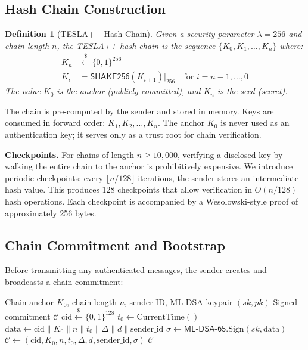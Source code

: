 \documentclass[conference,10pt]{IEEEtran}
\newtheorem{definition}[theorem]{Definition}
\newcommand{\SHAKE}{\textsf{SHAKE256}}
\newcommand{\MLDSA}{\textsf{ML-DSA-65}}
\begin{document}
\subsection{Hash Chain Construction}

\begin{definition}[TESLA++ Hash Chain]
Given a security parameter $\lambda = 256$ and chain length $n$, the TESLA++ hash chain is the sequence $\{K_0, K_1, \ldots, K_n\}$ where:
\begin{align}
  K_n &\xleftarrow{\$} \{0,1\}^{256} \label{eq:seed}\\
  K_i &= \SHAKE{}(K_{i+1})\big|_{256} \quad \text{for } i = n{-}1, \ldots, 0 \label{eq:chain}
\end{align}
The value $K_0$ is the \emph{anchor} (publicly committed), and $K_n$ is the \emph{seed} (secret).
\end{definition}

The chain is pre-computed by the sender and stored in memory. Keys are consumed in forward order: $K_1, K_2, \ldots, K_n$. The anchor $K_0$ is never used as an authentication key; it serves only as a trust root for chain verification.

\textbf{Checkpoints.} For chains of length $n \geq 10{,}000$, verifying a disclosed key by walking the entire chain to the anchor is prohibitively expensive. We introduce periodic checkpoints: every $\lfloor n/128 \rfloor$ iterations, the sender stores an intermediate hash value. This produces 128 checkpoints that allow verification in $O(n/128)$ hash operations. Each checkpoint is accompanied by a Wesolowski-style proof of approximately 256 bytes.

\subsection{Chain Commitment and Bootstrap}

Before transmitting any authenticated messages, the sender creates and broadcasts a chain commitment:

\begin{algorithm}[t]
\caption{TESLA++ Chain Commitment}
\label{alg:commitment}
\begin{algorithmic}[1]
\REQUIRE Chain anchor $K_0$, chain length $n$, sender ID, ML-DSA keypair $(sk, pk)$
\ENSURE Signed commitment $\mathcal{C}$
\STATE $\text{cid} \xleftarrow{\$} \{0,1\}^{128}$ 
\STATE $t_0 \gets \text{CurrentTime}()$
\STATE $\text{data} \gets \text{cid} \| K_0 \| n \| t_0 \| \Delta \| d \| \text{sender\_id}$
\STATE $\sigma \gets \MLDSA{}.\text{Sign}(sk, \text{data})$
\STATE $\mathcal{C} \gets (\text{cid}, K_0, n, t_0, \Delta, d, \text{sender\_id}, \sigma)$
\RETURN $\mathcal{C}$
\end{algorithmic}
\end{algorithm}
\end{document}
